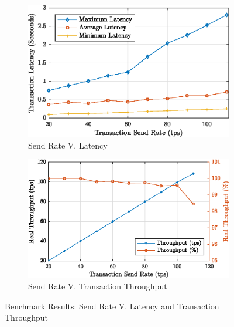\begin{figure}[htbp]
\centering
\begin{subfigure}{0.7\columnwidth}
\includegraphics[width=\columnwidth]{Figures/ICC-latency.eps}%
\caption{Send Rate V. Latency}%
\label{fig_latency}%
\end{subfigure}\hfill%
\begin{subfigure}{0.7\columnwidth}
\includegraphics[width=\columnwidth]{Figures/ICC-tps.eps}%
\caption{Send Rate V. Transaction Throughput}
\label{fig_TPS}
\end{subfigure}\hfill%
\caption{Benchmark Results: Send Rate V. Latency and Transaction Throughput}
\label{fig_results}%
\end{figure}





